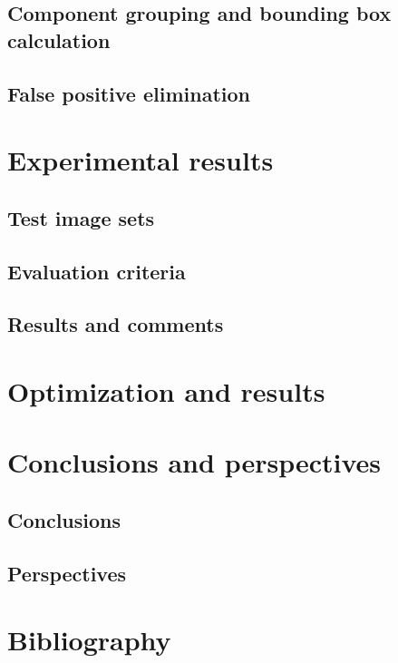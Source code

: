 \documentclass[12pt,a4paper]{article}
\begin{document}
\subsection{Component grouping and bounding box calculation}
\subsection{False positive elimination}
\section{Experimental results}
\subsection{Test image sets}
\subsection{Evaluation criteria}
\subsection{Results and comments}
\section{Optimization and results}
\section{Conclusions and perspectives}
\subsection{Conclusions}
\subsection{Perspectives}
\section{Bibliography}




	
\end{document}
